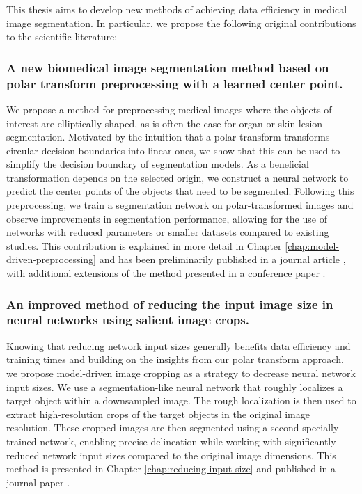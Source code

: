 This thesis aims to develop new methods of achieving data efficiency in medical image segmentation. In particular, we propose the following original contributions to the scientific literature:

\subsubsection{A new biomedical image segmentation method based on polar transform preprocessing with a learned center point.}

We propose a method for preprocessing medical images where the objects of interest are elliptically shaped, as is often the case for organ or skin lesion segmentation. Motivated by the intuition that a polar transform transforms circular decision boundaries into linear ones, we show that this can be used to simplify the decision boundary of segmentation models. As a beneficial transformation depends on the selected origin, we construct a neural network to predict the center points of the objects that need to be segmented. Following this preprocessing, we train a segmentation network on polar-transformed images and observe improvements in segmentation performance, allowing for the use of networks with reduced parameters or smaller datasets compared to existing studies. This contribution is explained in more detail in Chapter \ref{chap:model-driven-preprocessing} and has been preliminarily published in a journal article \cite{bencevicTrainingPolarImage2021}, with additional extensions of the method presented in a conference paper \cite{bencevicUsingPolarTransform2022}.

\subsubsection{An improved method of reducing the input image size in neural networks using salient image crops.}

Knowing that reducing network input sizes generally benefits data efficiency and training times and building on the insights from our polar transform approach, we propose model-driven image cropping as a strategy to decrease neural network input sizes. We use a segmentation-like neural network that roughly localizes a target object within a downsampled image. The rough localization is then used to extract high-resolution crops of the target objects in the original image resolution. These cropped images are then segmented using a second specially trained network, enabling precise delineation while working with significantly reduced network input sizes compared to the original image dimensions. This method is presented in Chapter \ref{chap:reducing-input-size} and published in a journal paper \cite{bencevicSegmentthenSegmentContextPreservingCropBased2023a}.

